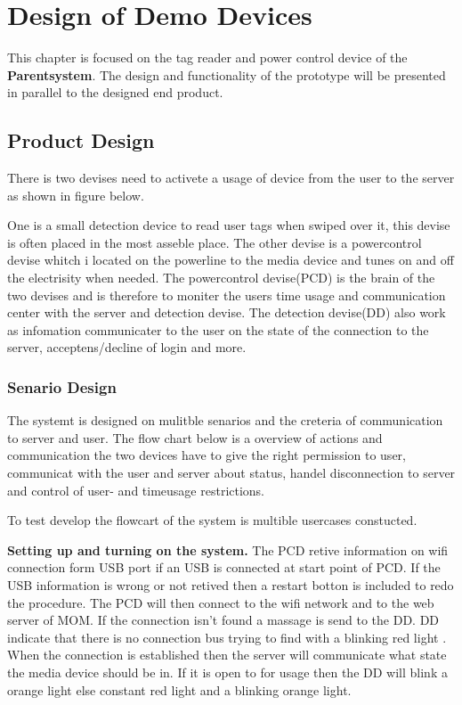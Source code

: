 \chapter{Design of Demo Devices}
This chapter is focused on the tag reader and power control device of the \textbf{Parentsystem}. 
The design and functionality of the prototype will be presented in parallel to the designed end product.

\section{Product Design}

There is two devises need to activete a usage of device from the user to the server as shown in figure below.


One is a small detection device to read user tags when swiped over it, this devise is often placed in the most asseble place. 
The other devise is a powercontrol devise whitch i located on the powerline to the media device and tunes on and off the electrisity when needed.
The powercontrol devise(PCD) is the brain of the two devises and is therefore to moniter the users time usage and communication center with the server and detection devise. 
The detection devise(DD) also work as infomation communicater to the user on the state of the connection to the server, acceptens/decline of login and more.     

\subsection{Senario Design}

The systemt is designed on mulitble senarios and the creteria of communication to server and user. The flow chart below is a overview of actions and communication the two devices have to give the right permission to user, communicat with the user and server about status, handel disconnection to server and control of user- and timeusage restrictions.


To test develop the flowcart of the system is multible usercases constucted.

\textbf{Setting up and turning on the system.} \n
The PCD retive information on wifi connection form USB port if an USB is connected at start point of PCD. 
If the USB information is wrong or not retived then a restart botton is included to redo the procedure.  
The PCD will then connect to the wifi network and to the web server of MOM. If the connection isn't found a massage is send to the DD. DD indicate that there is no connection bus trying to find with a blinking red light . When the connection is established then the server will communicate what state the media device should be in. If it is open to for usage then the DD will blink a orange light else constant red light and a blinking orange light. 

